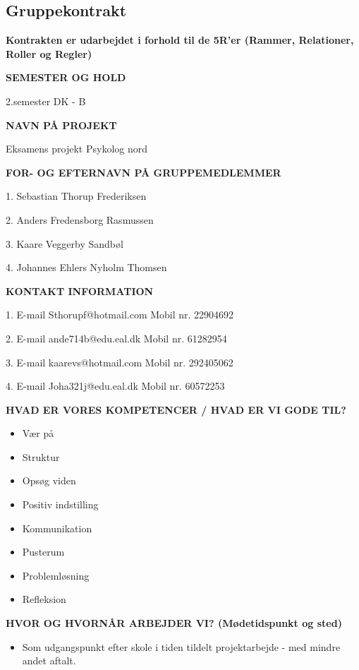 \subsection{Gruppekontrakt}
\label{bilag:gruppekontrakt}

\textbf{Kontrakten er udarbejdet i forhold til de 5R'er (Rammer, Relationer, Roller og Regler) }

\textbf{SEMESTER OG HOLD} 

2.semester DK - B 

 

\textbf{NAVN PÅ PROJEKT} 

Eksamens projekt Psykolog nord 


\textbf{FOR- OG EFTERNAVN PÅ GRUPPEMEDLEMMER} 

1. Sebastian Thorup Frederiksen 

2. Anders Fredensborg Rasmussen 

3. Kaare Veggerby Sandbøl 

4. Johannes Ehlers Nyholm Thomsen 

 

\textbf{KONTAKT INFORMATION} 

1. E-mail Sthorupf@hotmail.com  Mobil nr. 22904692 

2. E-mail ande714b@edu.eal.dk  Mobil nr. 61282954 

3. E-mail kaarevs@hotmail.com  Mobil nr. 292405062 

4. E-mail Joha321j@edu.eal.dk Mobil nr. 60572253 
 

 

\textbf{HVAD ER VORES KOMPETENCER / HVAD ER VI GODE TIL? }
\begin{itemize}
\item Vær på 

\item Struktur 

\item Opsøg viden 

\item Positiv indstilling 

\item Kommunikation 

\item Pusterum 

\item Problemløsning 

\item Refleksion 
\end{itemize}
\textbf{HVOR OG HVORNÅR ARBEJDER VI?  (Mødetidspunkt og sted) }
\begin{itemize}
\item Som udgangspunkt efter skole i tiden tildelt projektarbejde - med mindre andet aftalt. 
\end{itemize}

